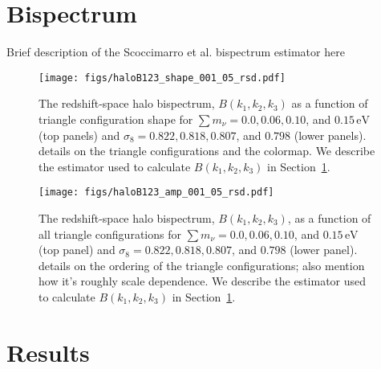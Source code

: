 \documentclass[12pt, letterpaper, preprint]{aastex62}
\newcommand{\smnu}{\sum m_\nu}
\newcommand{\sig}{\sigma_8}
\newcommand{\ch}[1]{{\color{orange}{\bf CH:} #1}}
\begin{document}
\section{Bispectrum} \label{sec:bk} 
Brief description of the Scoccimarro et al. bispectrum estimator here 

\begin{figure}
\begin{center}
\texttt{[image: figs/haloB123\_shape\_001\_05\_rsd.pdf]}
    \caption{The redshift-space halo bispectrum, $B(k_1, k_2, k_3)$ as a 
    function of triangle configuration shape for $\smnu = 0.0, 0.06, 0.10$, 
    and $0.15\,\mathrm{eV}$ (top panels) and $\sig = 0.822, 0.818, 0.807$, 
    and $0.798$ (lower panels). 
    \ch{details on the triangle configurations and the colormap}.
    We describe the estimator used to calculate $B(k_1, k_2, k_3)$ in 
    Section~\ref{sec:bk}.}
\label{fig:bk_shape}
\end{center}
\end{figure}

\begin{figure}
\begin{center}
\texttt{[image: figs/haloB123\_amp\_001\_05\_rsd.pdf]}
    \caption{The redshift-space halo bispectrum, $B(k_1, k_2, k_3)$, as a
    function of all triangle configurations for $\smnu = 0.0, 0.06, 0.10$, 
    and $0.15\,\mathrm{eV}$ (top panel) and $\sig = 0.822, 0.818, 0.807$, 
    and $0.798$ (lower panel). 
    \ch{details on the ordering of the triangle configurations; also mention
    how it's roughly scale dependence}.
    We describe the estimator used to calculate $B(k_1, k_2, k_3)$ in 
    Section~\ref{sec:bk}.}
\label{fig:bk_amp}
\end{center}
\end{figure}


\section{Results} \label{sec:results} 
\end{document}
